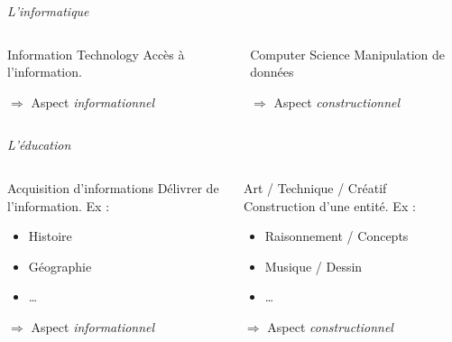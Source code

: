 \begin{frame}
  \begin{center}
    \vspace{.4cm}
    \emph{\huge L'informatique}
    \vspace{-.4cm}
  \end{center}
  \begin{columns}[T]
    \begin{column}[l]{.5\textwidth}
      \begin{block}{\og Information Technology \fg{}}
        Accès à l'information.
        
        $\Rightarrow$ Aspect \emph{informationnel}
      \end{block}
    \end{column}
    \begin{column}[l]{.5\textwidth}
      \begin{block}{\og Computer Science\fg{}}
        Manipulation de données
        
        $\Rightarrow$ Aspect \emph{constructionnel}
      \end{block}
    \end{column}
  \end{columns}
  \pause  
  \begin{center}
    \vspace{.4cm}
    \emph{\huge L'éducation}
    \vspace{-.4cm}
  \end{center}
  \begin{columns}[T]
    \begin{column}[l]{.5\textwidth}
      \begin{block}{Acquisition d'informations}
        Délivrer de l'information. Ex :
        \begin{itemize}
          \item Histoire
          \item Géographie
          \item \ldots
        \end{itemize}
        $\Rightarrow$ Aspect \emph{informationnel}
      \end{block}
    \end{column}
    \begin{column}[l]{.5\textwidth}
      \begin{block}{Art / Technique / Créatif}
        Construction d'une entité. Ex :
        \begin{itemize}
          \item Raisonnement / Concepts
          \item Musique / Dessin
          \item \ldots
        \end{itemize}
      $\Rightarrow$ Aspect \emph{constructionnel}
      \end{block}
    \end{column}
  \end{columns}
  
\end{frame}

